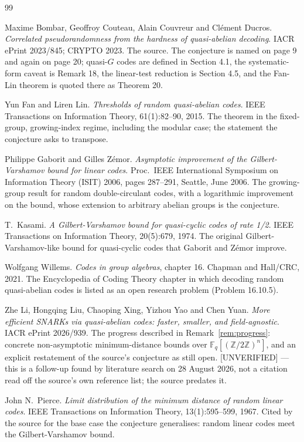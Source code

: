 \documentclass{aicr-conjecture}
\newcommand{\Fq}{\mathbb{F}_{q}}
\begin{document}
\begin{aicrbibliography}{99}

Maxime Bombar, Geoffroy Couteau, Alain Couvreur and Cl\'ement Ducros.
\emph{Correlated pseudorandomness from the hardness of quasi-abelian
decoding}.
IACR ePrint 2023/845; CRYPTO 2023.
The source. The conjecture is named on page 9 and again on page 20;
quasi-$G$ codes are defined in Section 4.1, the systematic-form caveat is
Remark 18, the linear-test reduction is Section 4.5, and the Fan-Lin
theorem is quoted there as Theorem 20.

Yun Fan and Liren Lin.
\emph{Thresholds of random quasi-abelian codes}.
IEEE Transactions on Information Theory, 61(1):82--90, 2015.
The theorem in the fixed-group, growing-index regime, including the
modular case; the statement the conjecture asks to transpose.

Philippe Gaborit and Gilles Z\'emor.
\emph{Asymptotic improvement of the Gilbert-Varshamov bound for linear
codes}.
Proc.\ IEEE International Symposium on Information Theory (ISIT) 2006,
pages 287--291, Seattle, June 2006.
The growing-group result for random double-circulant codes, with a
logarithmic improvement on the bound, whose extension to arbitrary
abelian groups is the conjecture.

T.\ Kasami.
\emph{A Gilbert-Varshamov bound for quasi-cyclic codes of rate 1/2}.
IEEE Transactions on Information Theory, 20(5):679, 1974.
The original Gilbert-Varshamov-like bound for quasi-cyclic codes that
Gaborit and Z\'emor improve.

Wolfgang Willems.
\emph{Codes in group algebras}, chapter 16.
Chapman and Hall/CRC, 2021.
The Encyclopedia of Coding Theory chapter in which decoding random
quasi-abelian codes is listed as an open research problem (Problem
16.10.5).

Zhe Li, Hongqing Liu, Chaoping Xing, Yizhou Yao and Chen Yuan.
\emph{More efficient SNARKs via quasi-abelian codes: faster, smaller, and
field-agnostic}.
IACR ePrint 2026/939.
The progress described in Remark~\ref{rem:progress}: concrete
non-asymptotic minimum-distance bounds over
$\Fq[(\mathbb{Z}/2\mathbb{Z})^{n}]$, and an explicit restatement of the
source's conjecture as still open.
[UNVERIFIED] --- this is a follow-up found by literature search on
28 August 2026, not a citation read off the source's own reference list;
the source predates it.

John N.\ Pierce.
\emph{Limit distribution of the minimum distance of random linear codes}.
IEEE Transactions on Information Theory, 13(1):595--599, 1967.
Cited by the source for the base case the conjecture generalises: random
linear codes meet the Gilbert-Varshamov bound.

\end{aicrbibliography}
\end{document}
